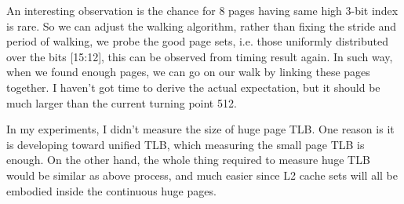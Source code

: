 An interesting observation is the chance for 8 pages having same high 3-bit
index is rare. So we can adjust the walking algorithm, rather than fixing the
stride and period of walking, we probe the good page sets, i.e. those uniformly
distributed over the bits [15:12], this can be observed from timing result
again. In such way, when we found enough pages, we can go on our walk by linking
these pages together. I haven't got time to derive the actual expectation, but
it should be much larger than the current turning point 512.

In my experiments, I didn't measure the size of huge page TLB. One reason is it
is developing toward unified TLB, which measuring the small page TLB is enough.
On the other hand, the whole thing required to measure huge TLB would be similar
as above process, and much easier since L2 cache sets will all be embodied inside
the continuous huge pages.

